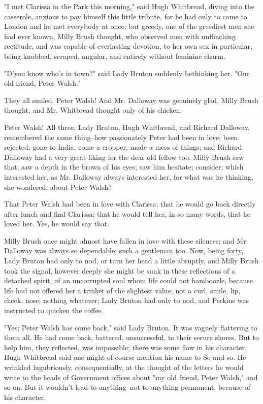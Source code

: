 \documentclass[lang=cn,10pt]{elegantbook}
\begin{document}
"I met Clarissa in the Park this morning," said Hugh Whitbread,
diving into the casserole, anxious to pay himself this little
tribute, for he had only to come to London and he met everybody at
once; but greedy, one of the greediest men she had ever known,
Milly Brush thought, who observed men with unflinching rectitude,
and was capable of everlasting devotion, to her own sex in
particular, being knobbed, scraped, angular, and entirely without
feminine charm.

"D'you know who's in town?" said Lady Bruton suddenly bethinking
her.  "Our old friend, Peter Walsh."

They all smiled.  Peter Walsh!  And Mr. Dalloway was genuinely
glad, Milly Brush thought; and Mr. Whitbread thought only of his
chicken.

Peter Walsh!  All three, Lady Bruton, Hugh Whitbread, and Richard
Dalloway, remembered the same thing--how passionately Peter had
been in love; been rejected; gone to India; come a cropper; made a
mess of things; and Richard Dalloway had a very great liking for
the dear old fellow too.  Milly Brush saw that; saw a depth in the
brown of his eyes; saw him hesitate; consider; which interested
her, as Mr. Dalloway always interested her, for what was he
thinking, she wondered, about Peter Walsh?

That Peter Walsh had been in love with Clarissa; that he would go
back directly after lunch and find Clarissa; that he would tell
her, in so many words, that he loved her.  Yes, he would say that.

Milly Brush once might almost have fallen in love with these
silences; and Mr. Dalloway was always so dependable; such a
gentleman too.  Now, being forty, Lady Bruton had only to nod, or
turn her head a little abruptly, and Milly Brush took the signal,
however deeply she might be sunk in these reflections of a detached
spirit, of an uncorrupted soul whom life could not bamboozle,
because life had not offered her a trinket of the slightest value;
not a curl, smile, lip, cheek, nose; nothing whatever; Lady Bruton
had only to nod, and Perkins was instructed to quicken the coffee.

"Yes; Peter Walsh has come back," said Lady Bruton.  It was vaguely
flattering to them all.  He had come back, battered, unsuccessful,
to their secure shores.  But to help him, they reflected, was
impossible; there was some flaw in his character.  Hugh Whitbread
said one might of course mention his name to So-and-so.  He
wrinkled lugubriously, consequentially, at the thought of the
letters he would write to the heads of Government offices about "my
old friend, Peter Walsh," and so on.  But it wouldn't lead to
anything--not to anything permanent, because of his character.
\end{document}

